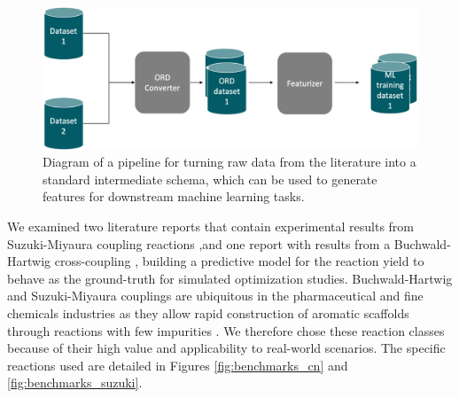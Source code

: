 \begin{figure}[t]
    \centering
    \includegraphics[width=\textwidth]{gfx/Chapter03/etl_pipeline.png}
    \caption{Diagram of a pipeline for turning raw data from the literature into a standard intermediate schema, which can be used to generate features for downstream machine learning tasks.}
    \label{fig:ord_pipeline}
\end{figure}

We examined two literature reports that contain experimental results from Suzuki-Miyaura coupling reactions \cite{Baumgartner2018, Reizman2016b} ,and one report with results from a Buchwald-Hartwig cross-coupling \cite{Baumgartner2019}, building a predictive model for the reaction yield to behave as the ground-truth for simulated optimization studies. Buchwald-Hartwig and Suzuki-Miyaura couplings are ubiquitous in the pharmaceutical and fine chemicals industries as they allow rapid construction of aromatic scaffolds through reactions with few impurities \cite{Brown2016}. We therefore chose these reaction classes because of their high value and applicability to real-world scenarios. The specific reactions used are detailed in Figures \ref{fig:benchmarks_cn} and \ref{fig:benchmarks_suzuki}.


